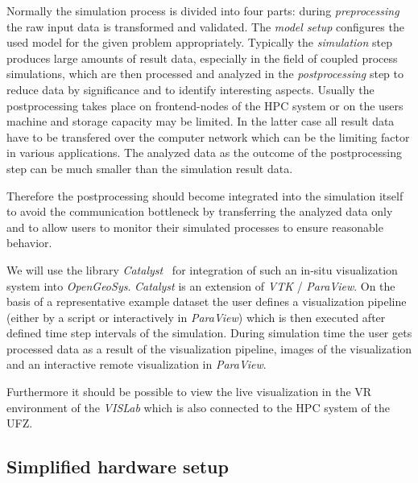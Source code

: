 \documentclass[twocolumn]{svjour3}          %
\begin{document}
Normally the simulation process is divided into four parts: during \emph{preprocessing} the raw input data is transformed and validated. The \emph{model setup} configures the used model for the given problem appropriately. Typically the \emph{simulation} step produces large amounts of result data, especially in the field of coupled process simulations, which are then processed and analyzed in the \emph{postprocessing} step to reduce data by significance and to identify interesting aspects. Usually the postprocessing takes place on frontend-nodes of the HPC system or on the users machine and storage capacity may be limited. In the latter case all result data have to be transfered over the computer network which can be the limiting factor in various applications. The analyzed data as the outcome of the postprocessing step can be much smaller than the simulation result data.

Therefore the postprocessing should become integrated into the simulation itself to avoid the communication bottleneck by transferring the analyzed data only and to allow users to monitor their simulated processes to ensure reasonable behavior.

We will use the library \emph{Catalyst}~\cite{web:catalyst} for integration of such an in-situ visualization system into \emph{OpenGeoSys}. \emph{Catalyst} is an extension of \emph{VTK} / \emph{ParaView}. On the basis of a representative example dataset the user defines a visualization pipeline (either by a script or interactively in \emph{ParaView}) which is then executed after defined time step intervals of the simulation. During simulation time the user gets processed data as a result of the visualization pipeline, images of the visualization and an interactive remote visualization in \emph{ParaView}.

Furthermore it should be possible to view the live visualization in the VR environment of the \emph{VISLab} which is also connected to the HPC system of the UFZ.

\subsection{Simplified hardware setup}
\label{simplified-hardware-setup}
\end{document}
